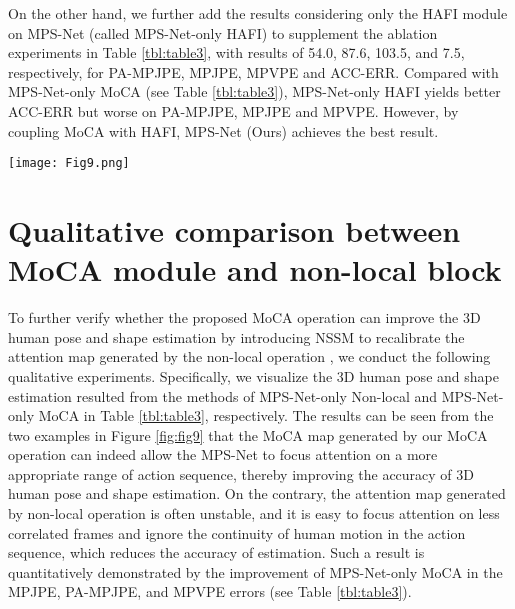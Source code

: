 \documentclass[10pt,twocolumn,letterpaper]{article}
\begin{document}
On the other hand, we further add the results considering only the HAFI module on MPS-Net (called MPS-Net-only HAFI) to supplement the ablation experiments in Table \ref{tbl:table3}, with results of 54.0, 87.6, 103.5, and 7.5, respectively, for PA-MPJPE, MPJPE, MPVPE and ACC-ERR. Compared with MPS-Net-only MoCA (see Table \ref{tbl:table3}), MPS-Net-only HAFI yields better ACC-ERR but worse on PA-MPJPE, MPJPE and MPVPE. However, by coupling MoCA with HAFI, MPS-Net (Ours) achieves the best result.





\begin{figure*}[t]
  \centering
\texttt{[image: Fig9.png]}
  \caption{Visual comparison of 3D human pose and shape estimation of MoCA module and non-local block \cite{Wang2018NonlocalNN} on the 3DPW dataset \cite{Marcard2018RecoveringA3}. Where the attention map is generated from the non-local operation, and the MoCA map is generated from the MoCA operation. In the attention and MoCA maps, red indicates a higher attention value, and blue indicates a lower one. The results demonstrate that the MoCA map generated by our MoCA operation can indeed allow the MPS-Net to focus attention on a more appropriate range of action sequence to improve the estimation results.}
  \label{fig:fig9}
\end{figure*}

\section{Qualitative comparison between MoCA module and non-local block}

To further verify whether the proposed MoCA operation can improve the 3D human pose and shape estimation by introducing NSSM to recalibrate the attention map generated by the non-local operation \cite{Wang2018NonlocalNN}, we conduct the following qualitative experiments. Specifically, we visualize the 3D human pose and shape estimation resulted from the methods of MPS-Net-only Non-local and MPS-Net-only MoCA in Table \ref{tbl:table3}, respectively. The results can be seen from the two examples in Figure \ref{fig:fig9} that the MoCA map generated by our MoCA operation can indeed allow the MPS-Net to focus attention on a more appropriate range of action sequence, thereby improving the accuracy of 3D human pose and shape estimation. On the contrary, the attention map generated by non-local operation is often unstable, and it is easy to focus attention on less correlated frames and ignore the continuity of human motion in the action sequence, which reduces the accuracy of estimation. Such a result is quantitatively demonstrated by the improvement of MPS-Net-only MoCA in the MPJPE, PA-MPJPE, and MPVPE errors (see Table \ref{tbl:table3}).
\end{document}

